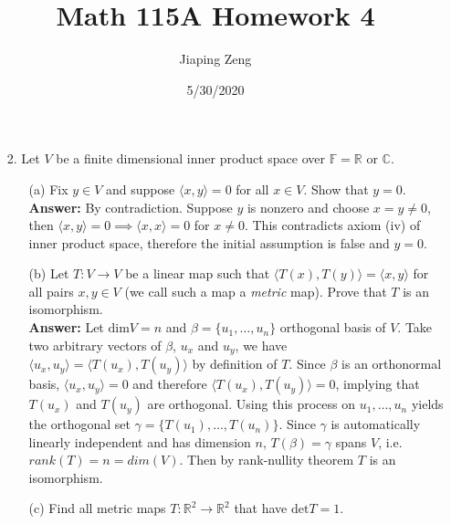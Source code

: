 \documentclass{article}
\title{Math 115A Homework 4}
\date{5/30/2020}
\author{Jiaping Zeng}
\begin{document}
\maketitle

\begin{itemize}
	\item [2.] Let $V$ be a finite dimensional inner product space over $\mathbb{F}=\mathbb{R}\text{ or }\mathbb{C}$. 
	\begin{itemize}
		\item [(a)] Fix $y\in V$ and suppose $\langle x,y\rangle=0$ for all $x\in V$. Show that $y=0$.\\
		\textbf{Answer: } By contradiction. Suppose $y$ is nonzero and choose $x=y\neq 0$, then $\langle x,y\rangle=0 \implies \langle x,x\rangle=0$ for $x\neq 0$. This contradicts axiom (iv) of inner product space, therefore the initial assumption is false and $y=0$.
		\item [(b)] Let $T:V\rightarrow V$ be a linear map such that $\langle T(x),T(y)\rangle=\langle x,y\rangle$ for all pairs $x,y\in V$ (we call such a map a \textit{metric} map). Prove that $T$ is an isomorphism.\\
		\textbf{Answer: } Let $\text{dim}V=n$ and $\beta=\{u_1,\ldots,u_n\}$ orthogonal basis of $V$. Take two arbitrary vectors of $\beta$, $u_x$ and $u_y$, we have $\langle u_x,u_y\rangle=\langle T(u_x),T(u_y)\rangle$ by definition of $T$. Since $\beta$ is an orthonormal basis, $\langle u_x,u_y\rangle=0$ and therefore $\langle T(u_x),T(u_y)\rangle=0$, implying that $T(u_x)$ and $T(u_y)$ are orthogonal. Using this process on $u_1,\ldots,u_n$ yields the orthogonal set $\gamma=\{T(u_1),\ldots,T(u_n)\}$. Since $\gamma$ is automatically linearly independent and has dimension $n$, $T(\beta)=\gamma$ spans $V$, i.e. $rank(T)=n=dim(V)$. Then by rank-nullity theorem $T$ is an isomorphism.
		\item [(c)] Find all metric maps $T:\mathbb{R}^2\rightarrow\mathbb{R}^2$ that have $\text{det}T=1$.\\

\end{itemize}
\end{itemize}
\end{document}
